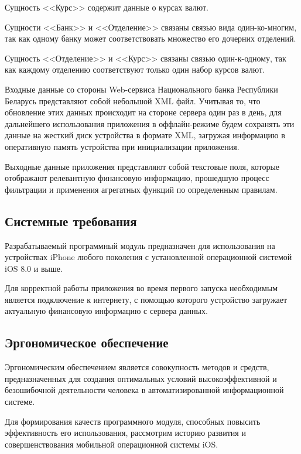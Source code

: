 Сущность <<Курс>> содержит данные о курсах валют.

Сущности <<Банк>> и <<Отделение>> связаны связью
вида один-ко-многим, так как одному банку может соответствовать
множество его дочерних отделений.

Сущность <<Отделение>> и <<Курс>> связаны связью один-к-одному,
так как каждому отделению соответствуют только один набор курсов валют.

Входные данные со стороны Web-сервиса Национального банка Республики Беларусь
представляют собой небольшой XML файл. Учитывая то, что обновление этих данных
происходит на стороне сервера один раз в день, для дальнейшего использования
приложения в оффлайн-режиме будем сохранять эти данные на жесткий
диск устройства в формате XML, загружая информацию в оперативную память
устройства при инициализации приложения.

Выходные данные приложения представляют собой текстовые поля, которые
отображают релевантную финансовую информацию, прошедшую процесс фильтрации
и применения агрегатных функций по определенным правилам.



\subsection{Системные требования}

Разрабатываемый программный модуль предназначен для использования на устройствах
iPhone любого поколения с установленной операционной системой iOS 8.0 и выше.

Для корректной работы приложения во время первого запуска необходимым является
подключение к интернету, с помощью которого устройство загружает актуальную
финансовую информацию с сервера данных.


\subsection{Эргономическое обеспечение}

Эргономическим обеспечением является совокупность методов и средств,
предназначенных для создания оптимальных условий высокоэффективной и
безошибочной деятельности человека в автоматизированной информационной системе.

Для формирования качеств программного модуля, способных повысить эффективность его
использования, рассмотрим историю развития и совершенствования мобильной
операционной системы iOS.

